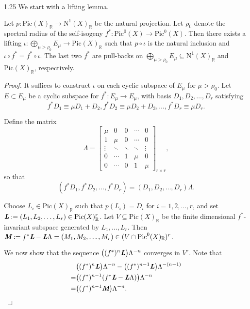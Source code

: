 \documentclass[12pt]{amsart}
\newcommand{\mb}[1]{\mathbb{#1}}
\newcommand{\mr}[1]{\mathrm{#1}}
\newcommand\ra{\rightarrow}
\newcommand{\mib}[1]{\textit{\textbf{#1}}}
\begin{document}
\begin{spacing}{1.25}
We start with a lifting lemma.

\begin{lemma}\label{Lem_lift}
Let $p: \mr{Pic}(X)_{\mb{R}}\ra \mr{N}^1(X)_{\mb{R}}$ be the natural projection. Let $\rho_0$ denote the spectral radius of the self-isogeny $f^*: \mr{Pic}^0(X)\ra \mr{Pic}^0(X)$. Then there exists a lifting $\iota: \bigoplus\limits_{\mu>\rho_0}E_{\mu}\ra \mr{Pic}(X)_{\mb{R}}$ such that $p\circ\iota$ is the natural inclusion and $\iota\circ f^*=f^*\circ\iota$. The last two $f^*$ are pull-backs on $\bigoplus\limits_{\mu>\rho_0}E_{\mu}\subseteq\mathrm{N}^1(X)_{\mathbb{R}}$ and $\mathrm{Pic}(X)_{\mathbb{R}}$, respectively.
\end{lemma}

\begin{proof}
It suffices to construct $\iota$ on each cyclic subspace of $E_\mu$ for $\mu > \rho_0$. Let $E \subset E_\mu$ be a cyclic subspace for $f^*: E_\mu \to E_\mu$, with basis $D_1, D_2, \ldots, D_r$ satisfying
\[f^*D_1\equiv \mu D_1+D_2, f^*D_2\equiv\mu D_2+D_3,\ldots, f^*D_r\equiv\mu D_r.\]

Define the matrix
\[
\Lambda = 
\begin{bmatrix}
\mu & 0 & 0 & \cdots & 0 \\
1 & \mu & 0 & \cdots & 0 \\
\vdots & \ddots & \ddots & \ddots & \vdots \\
0 & \cdots & 1 & \mu & 0 \\
0 & \cdots & 0 & 1 & \mu
\end{bmatrix}_{r\times r},
\]
so that
\[(f^*D_1,f^*D_2,\ldots,f^*D_r)=(D_1,D_2,\ldots,D_r)\Lambda.\]

Choose $L_i\in \mr{Pic}(X)_{\mb{R}}$ such that $p(L_i)=D_i$ for $i=1,2,\ldots,r$, and set $\mib{L}:=(L_1,L_2,\ldots,L_r)\in \mr{Pic}(X)_{\mb{R}}^{r}$. Let $V\subseteq\mr{Pic}(X)_{\mb{R}}$ be the finite dimensional $f^*$-invariant subspace generated by $L_1,\dots,L_r$. Then $\mib{M}:=f^*\mib{L}-\mib{L}\Lambda=(M_1,M_2,\ldots,M_r) \in (V\cap\mr{Pic}^0(X)_{\mb{R}})^r$.

We now show that the sequence $\big((f^*)^n\mib{L}\big)\Lambda^{-n}$ converges in $V^{r}$. Note that
\[
\begin{aligned}
&\big((f^*)^n\mib{L}\big)\Lambda^{-n}-\big((f^*)^{n-1}\mib{L}\big)\Lambda^{-(n-1)}\\
=&\big((f^{*})^{n-1}(f^*\mib{L}-\mib{L}\Lambda)\big)\Lambda^{-n}  \\
=&\big((f^{*})^{n-1}\mib{M}\big)\Lambda^{-n}. \\
\end{aligned}
\]


\end{proof}
\end{spacing}
\end{document}
